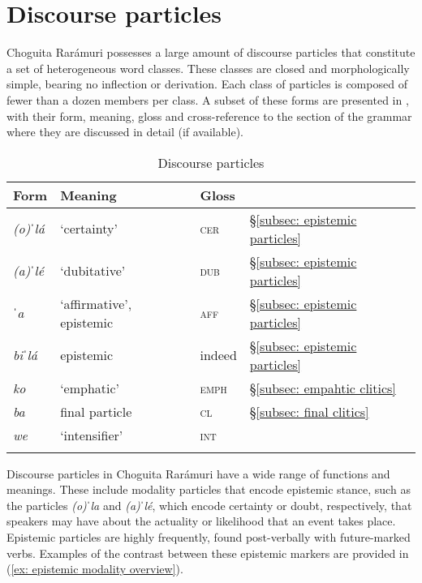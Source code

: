 \section{Discourse particles}
\label{sec: discourse particles and enclitics}

Choguita Rarámuri possesses a large amount of discourse particles that constitute a set of heterogeneous word classes. These classes are closed and morphologically simple, bearing no inflection or derivation. Each class of particles is composed of fewer than a dozen members per class. A subset of these forms are presented in , with their form, meaning, gloss and cross-reference to the section of the grammar where they are discussed in detail (if available).

\begin{table}
\caption{Discourse particles}
\label{tab:particles}

\begin{tabularx}{.7\textwidth}{lQll}
\lsptoprule
\textbf{Form} & \textbf{Meaning}  & \textbf{Gloss} & \\
\midrule
\textit{(o)ˈlá}  &     `certainty'      &   \textsc{cer} & §\ref{subsec: epistemic particles}\\
\textit{(a)ˈlé} &    `dubitative' &  \textsc{dub}    & §\ref{subsec: epistemic particles} \\
\textit{ˈa} &   `affirmative', epistemic &  \textsc{aff}    & §\ref{subsec: epistemic particles} \\
\textit{biˈlá} &   epistemic &  indeed    & §\ref{subsec: epistemic particles} \\
\textit{ko} &   `emphatic'  &  \textsc{emph} & §\ref{subsec: empahtic clitics} \\
\textit{ba}  &    final particle   &   \textsc{cl} & §\ref{subsec: final clitics}\\
\textit{we} & `intensifier'    & \textsc{int}  & \\
\lspbottomrule
\end{tabularx}
\end{table}


Discourse particles in Choguita Rarámuri have a wide range of functions and meanings. These include modality particles that encode epistemic stance, such as the particles \textit{(o)ˈla} and \textit{(a)ˈlé}, which encode certainty or doubt, respectively, that speakers may have about the actuality or likelihood that an event takes place. Epistemic particles are highly frequently, found post-verbally with future-marked verbs. Examples of the contrast between these epistemic markers are provided in (\ref{ex: epistemic modality overview}).

